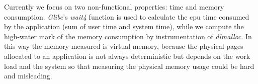 Currently we focus on two non-functional properties: time and memory consumption. \emph{Glibc}'s \emph{wait4} function is used to calculate the cpu time consumed by the application (sum of user time and system time), while we compute the high-water mark of the memory consumption by instrumentation of \emph{dlmalloc}. In this way the memory measured is virtual memory, because the physical pages allocated to an application is not always deterministic but depends on the work load and the system so that measuring the physical memory usage could be hard and misleading.


